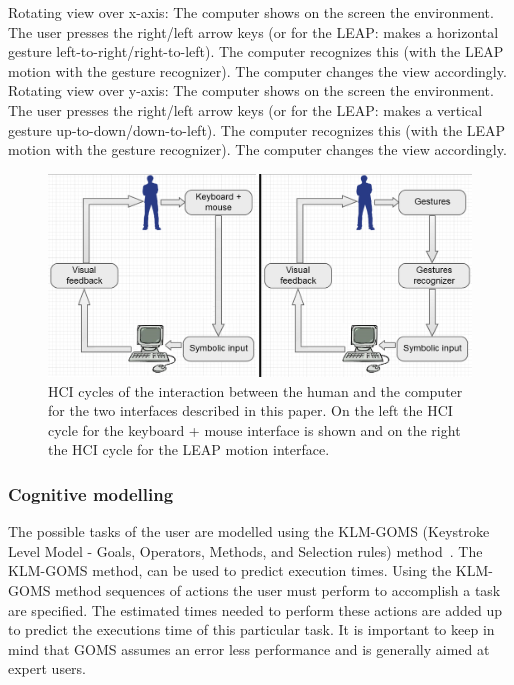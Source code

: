 \newline\newline
Rotating view over x-axis: 
\newline The computer shows on the screen the environment. The user presses the right/left arrow keys (or for the LEAP: makes a horizontal gesture left-to-right/right-to-left). The computer recognizes this (with the LEAP motion with the gesture recognizer). The computer changes the view accordingly.
\newline\newline
Rotating view over y-axis: 
\newline The computer shows on the screen the environment. The user presses the right/left arrow keys (or for the LEAP: makes a vertical gesture up-to-down/down-to-left). The computer recognizes this (with the LEAP motion with the gesture recognizer). The computer changes the view accordingly.

\begin{figure}[H]
\includegraphics[width=\textwidth]{imgs/HCIcycles.png}
\caption{\label{fig:HCIcycles}HCI cycles of the interaction between the human and the computer for the two interfaces described in this paper. On the left the HCI cycle for the keyboard + mouse interface is shown and on the right the HCI cycle for the LEAP motion interface.}
\end{figure}

\subsubsection{Cognitive modelling}
The possible tasks of the user are modelled using the KLM-GOMS (Keystroke Level Model - Goals, Operators, Methods, and Selection rules) method~\cite{john1996goms}. The KLM-GOMS method, can be used to predict execution times. Using the KLM-GOMS method sequences of actions the user must perform to accomplish a task are specified. The estimated times needed to perform these actions are added up to predict the executions time of this particular task. It is important to keep in mind that GOMS assumes an error less performance and is generally aimed at expert users.


